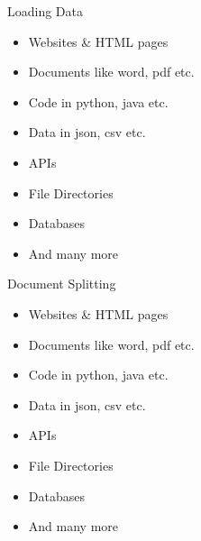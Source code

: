 \begin{frame}[fragile]{Loading Data}
    \begin{itemize}
        \item Websites \& HTML pages
        \item Documents like word, pdf etc.
        \item Code in python, java etc.
        \item Data in json, csv etc.
        \item APIs
        \item File Directories
        \item Databases
        \item And many more
    \end{itemize}
\end{frame}

\begin{frame}[fragile]{Document Splitting}
    \begin{itemize}
        \item Websites \& HTML pages
        \item Documents like word, pdf etc.
        \item Code in python, java etc.
        \item Data in json, csv etc.
        \item APIs
        \item File Directories
        \item Databases
        \item And many more
    \end{itemize}
\end{frame}


